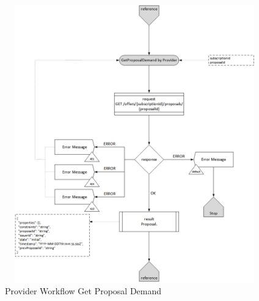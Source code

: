 \begin{enumerate}
\begin{figure}[H]
    \centering
    \includegraphics[width=12cm,height=12cm,angle=0]{./diag/Workflow/Market/GetProposalDemand-P-Workflow.png}
    \caption{Provider Workflow Get Proposal Demand }
	\label{fig:GPD}
\end{figure}

\end{enumerate}

\newpage


